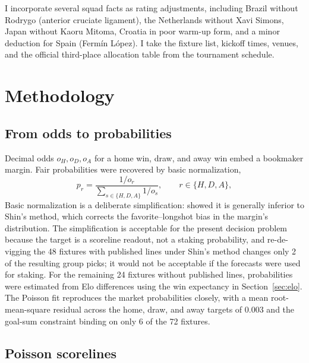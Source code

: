 \documentclass[11pt,letterpaper]{article}
\begin{document}
I incorporate several squad facts as rating adjustments, including Brazil without Rodrygo (anterior cruciate ligament), the Netherlands without Xavi Simons, Japan without Kaoru Mitoma, Croatia in poor warm-up form, and a minor deduction for Spain (Fermín López). I take the fixture list, kickoff times, venues, and the official third-place allocation table from the tournament schedule.



\section{Methodology}\label{sec:method}

\subsection{From odds to probabilities}

Decimal odds $o_H, o_D, o_A$ for a home win, draw, and away win embed a bookmaker margin. Fair probabilities were recovered by basic normalization,
\begin{equation}
p_r = \frac{1/o_r}{\sum_{s \in \{H,D,A\}} 1/o_s}, \qquad r \in \{H,D,A\},
\end{equation}
Basic normalization is a deliberate simplification: \citet{strumbelj2014} showed it is generally inferior to Shin's method, which corrects the favorite--longshot bias in the margin's distribution. The simplification is acceptable for the present decision problem because the target is a scoreline readout, not a staking probability, and re-de-vigging the 48 fixtures with published lines under Shin's method changes only 2 of the resulting group picks; it would not be acceptable if the forecasts were used for staking. For the remaining 24 fixtures without published lines, probabilities were estimated from Elo differences using the win expectancy in Section~\ref{sec:elo}. The Poisson fit reproduces the market probabilities closely, with a mean root-mean-square residual across the home, draw, and away targets of 0.003 and the goal-sum constraint binding on only 6 of the 72 fixtures.

\subsection{Poisson scorelines}
\end{document}
